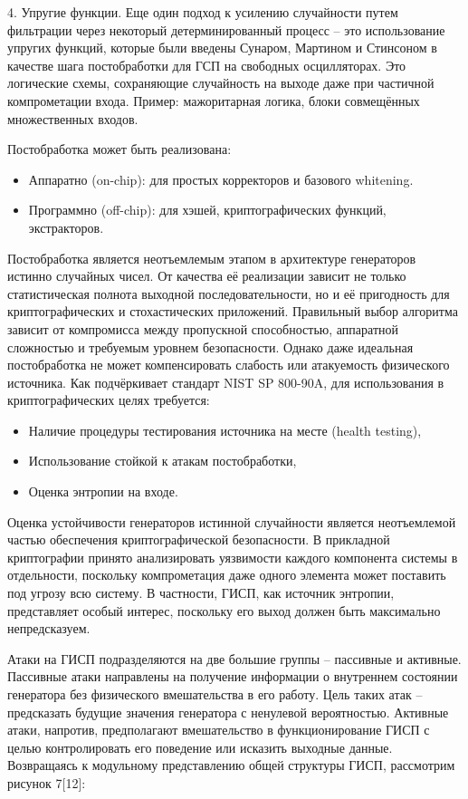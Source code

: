 4. Упругие функции. Еще один подход к усилению случайности путем
фильтрации через некоторый детерминированный процесс -- это
использование упругих функций, которые были введены Сунаром, Мартином и
Стинсоном в качестве шага постобработки для ГСП на свободных
осцилляторах. Это логические схемы, сохраняющие случайность на выходе
даже при частичной компрометации входа. Пример: мажоритарная логика,
блоки совмещённых множественных входов.

Постобработка может быть реализована:

\begin{itemize}
\item
  Аппаратно (on-chip): для простых корректоров и базового whitening.
\item
  Программно (off-chip): для хэшей, криптографических функций,
  экстракторов.
\end{itemize}

Постобработка является неотъемлемым этапом в архитектуре генераторов
истинно случайных чисел. От качества её реализации зависит не только
статистическая полнота выходной последовательности, но и её пригодность
для криптографических и стохастических приложений. Правильный выбор
алгоритма зависит от компромисса между пропускной способностью,
аппаратной сложностью и требуемым уровнем безопасности. Однако даже
идеальная постобработка не может компенсировать слабость или атакуемость
физического источника. Как подчёркивает стандарт NIST SP 800-90A, для
использования в криптографических целях требуется:

\begin{itemize}
\item
  Наличие процедуры тестирования источника на месте (health testing),
\item
  Использование стойкой к атакам постобработки,
\item
  Оценка энтропии на входе.
\end{itemize}


Оценка устойчивости генераторов истинной случайности является
неотъемлемой частью обеспечения криптографической безопасности. В
прикладной криптографии принято анализировать уязвимости каждого
компонента системы в отдельности, поскольку компрометация даже одного
элемента может поставить под угрозу всю систему. В частности, ГИСП, как
источник энтропии, представляет особый интерес, поскольку его выход
должен быть максимально непредсказуем.

Атаки на ГИСП подразделяются на две большие группы -- пассивные и
активные. Пассивные атаки направлены на получение информации о
внутреннем состоянии генератора без физического вмешательства в его
работу. Цель таких атак -- предсказать будущие значения генератора с
ненулевой вероятностью. Активные атаки, напротив, предполагают
вмешательство в функционирование ГИСП с целью контролировать его
поведение или исказить выходные данные. Возвращаясь к модульному
представлению общей структуры ГИСП, рассмотрим рисунок 7{[}12{]}:

